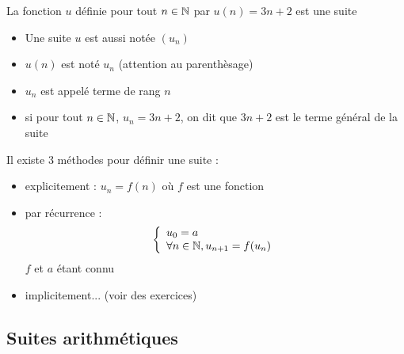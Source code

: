 \begin{exemple}
La fonction $u$ définie pour tout $n\in\mathbb{N}$ par $u(n) = 3n+2$ est une suite
\end{exemple}
\begin{remarques}
\begin{itemize}
\item Une suite $u$ est aussi notée $(u_n)$
\item $u(n)$ est noté $u_n$ (attention au parenthèsage)
\item $u_n$ est appelé terme de rang $n$
\item si pour tout $n\in\mathbb{N}$, $u_n = 3n+2$, on dit que $3n+2$ est le terme général de la suite
\end{itemize}
\end{remarques}
Il existe 3 méthodes pour définir une suite : 
\begin{itemize}
\item explicitement : $u_n = f(n)$ où $f$ est une fonction
\item par récurrence : $$\left\{ \begin{array}{l}
  u_0 = a\\
  \forall n \in \mathbb{N}, u_{n+1} = f(u_n)
\end{array}\right.$$
$f$ et $a$ étant connu
\item implicitement... (voir des exercices)
\end{itemize}
\subsection{Suites arithmétiques}
\newline

